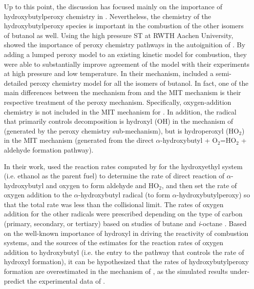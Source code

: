 \documentclass[../main.tex]{subfiles}
\begin{document}
Up to this point, the discussion has focused mainly on the importance of
hydroxybutylperoxy chemistry in \tBuOH{}. Nevertheless, the chemistry
of the hydroxybutylperoxy species is important in the combustion of the other
isomers of butanol as well. Using the high pressure ST at RWTH Aachen
University, \textcite{Vranckx2011} showed the importance of peroxy chemistry
pathways in the autoignition of \nBuOH{}. By adding a lumped peroxy
model to an existing kinetic model for \nBuOH{} combustion, they were
able to substantially improve agreement of the model with their experiments at
high pressure and low temperature. In their mechanism, \textcite{Sarathy2012}
included a semi-detailed peroxy chemistry model for all the isomers of butanol.
In fact, one of the main differences between the mechanism from
\textcite{Sarathy2012} and the MIT mechanism \cite{Hansen2013,Merchant2013} is
their respective treatment of the peroxy mechanism. Specifically,
oxygen-addition chemistry is not included in the MIT mechanism for
\iBuOH{} \cite{Hansen2013,Merchant2013}. In addition, the radical
that primarily controls \iBuOH{} decomposition is hydroxyl (OH) in
the mechanism of \textcite{Sarathy2012} (generated by the peroxy chemistry
sub-mechanism), but is hydroperoxyl (HO$_2$) in the MIT mechanism
\cite{Hansen2013,Merchant2013} (generated from the direct $\alpha$-hydroxybutyl
+ O$_2$=HO$_2$ + aldehyde formation pathway).

In their work, \textcite{Sarathy2012} used the reaction rates computed by
\textcite{DaSilva2009} for the hydroxyethyl system (i.e. ethanol as the parent
fuel) to determine the rate of direct reaction of $\alpha$-hydroxybutyl and
oxygen to form aldehyde and HO$_2$, and then set the rate of oxygen addition to
the $\alpha$-hydroxybutyl radical (to form $\alpha$-hydroxybutylperoxy) so that
the total rate was less than the collisional limit. The rates of oxygen
addition for the other radicals were prescribed depending on the type of carbon
(primary, secondary, or tertiary) based on studies of butane and
\textit{i}-octane \cite{Sarathy2012}. Based on the well-known importance of
hydroxyl in driving the reactivity of combustion systems, and the sources of
the estimates for the reaction rates of oxygen addition to hydroxybutyl (i.e.
the entry to the pathway that controls the rate of hydroxyl formation), it can
be hypothesized that the rates of hydroxybutylperoxy formation are
overestimated in the mechanism of \textcite{Sarathy2012}, as the simulated
results under-predict the experimental data of \iBuOH{}.
\end{document}
